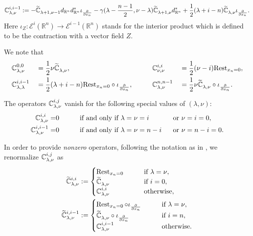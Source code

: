 \begin{equation}
\label{eqn:Cijln}
{\mathbb{C}}_{{\lambda},{\nu}}^{{i,i-1}}
:=
- \widetilde{{\mathbb{C}}}_{{\lambda+1},{\nu-1}}^{{}} d_{\mathbb{R}^n} d_{\mathbb{R}^n}^{\ast}
 \iota_{\frac{\partial}{\partial x_n}}
-
\gamma(\lambda - \frac {n-1} 2, \nu -\lambda) 
\widetilde{{\mathbb{C}}}_{{\lambda+1},{\nu}}^{{}} d_{\mathbb{R}^n}^{\ast}
+
\frac 1 2
(\lambda+i-n)
\widetilde{{\mathbb{C}}}_{{\lambda},{\nu}}^{{}}\iota_{\frac{\partial}{\partial x_n}}.  
\end{equation}
Here 
$
   \iota_{Z}\colon {\mathcal{E}}^i({\mathbb{R}^n}) \to {\mathcal{E}}^{i-1}({\mathbb{R}^n})
$
 stands
 for the interior product 
 which is defined to be the contraction with a vector field $Z$.  



We note that 
\begin{alignat*}{4}
&{\mathbb{C}}_{{\lambda},{\nu}}^{{0,0}}
&&=\frac 1 2 \nu \widetilde{{\mathbb{C}}}_{{\lambda},{\nu}}^{{}}, 
\qquad
&&{\mathbb{C}}_{{\nu},{\nu}}^{{i,i}}
&&=\frac 1 2 (\nu-i){\operatorname{Rest}}_{x_n=0}, 
\\
&{\mathbb{C}}_{{\lambda},{\lambda}}^{{i,i-1}}
&&=\frac 1 2 (\lambda+i-n){\operatorname{Rest}}_{x_n=0}
 \circ \iota_{\frac{\partial}{\partial x_n}}, 
\qquad
&&{\mathbb{C}}_{{\lambda},{\nu}}^{{n,n-1}} 
&&= \frac 1 2 \nu \widetilde{{\mathbb{C}}}_{{\lambda},{\nu}}^{{}}
    \circ \iota_{\frac{\partial}{\partial x_n}}.  
\end{alignat*}

The operators ${\mathbb{C}}_{{\lambda},{\nu}}^{{i,j}}$ vanish
 for the following special values of $(\lambda, \nu)$:
\begin{alignat*}{3}
{\mathbb{C}}_{{\lambda},{\nu}}^{{i,i}} = & 0
\qquad
&&\text{if and only if }
\lambda =  \nu = i\,\,
&&\text{ or }
\nu=i=0, 
\\
{\mathbb{C}}_{{\lambda},{\nu}}^{{i,i-1}} = & 0
\qquad
&&\text{if and only if }
\lambda =  \nu =n-i\,\,
&&\text{ or }
\nu=n-i=0.  
\end{alignat*}



In order to provide {\it{nonzero}} operators, 
 following the notation as in \cite[(2.30)]{KKP}, 
 we renormalize ${\mathbb{C}}_{{\lambda},{\nu}}^{{i,j}}$ as 
\begin{align}
\widetilde{{\mathbb{C}}}_{{\lambda},{\nu}}^{{i,i}}
&:=
\begin{cases}
\operatorname{Rest}_{x_n=0}
\qquad
&\text{if $\lambda = \nu$}, 
\\
\widetilde{{\mathbb{C}}}_{{\lambda},{\nu}}^{{}}
&\text{if $i=0$}, 
\\
{\mathbb{C}}_{{\lambda},{\nu}}^{{i,i}}
&\text{otherwise}, 
\end{cases}
\label{eqn:Ciitilde}
\\
\widetilde{{\mathbb{C}}}_{{\lambda},{\nu}}^{{i,i-1}}
&:=
\begin{cases}
\operatorname{Rest}_{x_n=0}\circ \iota_{\frac{\partial}{\partial x_n}}
\qquad
&\text{if $\lambda = \nu$}, 
\\
\widetilde{{\mathbb{C}}}_{{\lambda},{\nu}}^{{}}\circ \iota_{\frac{\partial}{\partial x_n}}
&\text{if $i=n$}, 
\\
{\mathbb{C}}_{{\lambda},{\nu}}^{{i,i-1}}
&\text{otherwise}.  
\end{cases}
\label{eqn:Cii-1tilde}
\end{align}

